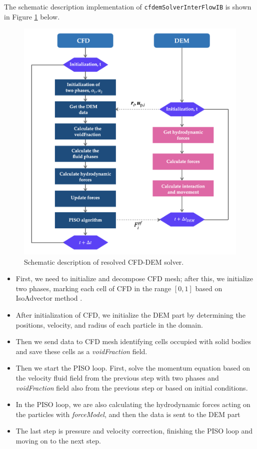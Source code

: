 The schematic description implementation of  \verb|cfdemSolverInterFlowIB| is shown in Figure \ref{fig:cfddemSolver} below. 
\begin{figure}[!ht]
    \centering
    \includegraphics[width=17cm]{Images/chap3/CFD-DEM_scheme.png}
    \caption{Schematic description of resolved CFD-DEM solver.}
    \label{fig:cfddemSolver}
\end{figure}
\begin{itemize}
    \item First, we need to initialize and decompose CFD mesh; after this, we initialize two phases, marking each cell of CFD in the range $[0,1]$ based on IsoAdvector method \cite{roenby2019isoadvector}.
    \item  After initialization of CFD, we initialize the DEM part by determining the positions, velocity, and radius of each particle in the domain.
    \item Then we send data to CFD mesh identifying cells occupied with solid bodies and save these cells as a \textit{voidFraction} field. 
    \item Then we start the PISO loop. First, solve the momentum equation based on the velocity fluid field from the previous step with two phases and \textit{voidFraction} field also from the previous step or based on initial conditions.
    \item In the PISO loop, we are also calculating the hydrodynamic forces acting on the particles with \textit{forceModel}, and then the data is sent to the DEM part
    \item The last step is pressure and velocity correction, finishing the PISO loop and moving on to the next step.
\end{itemize}

